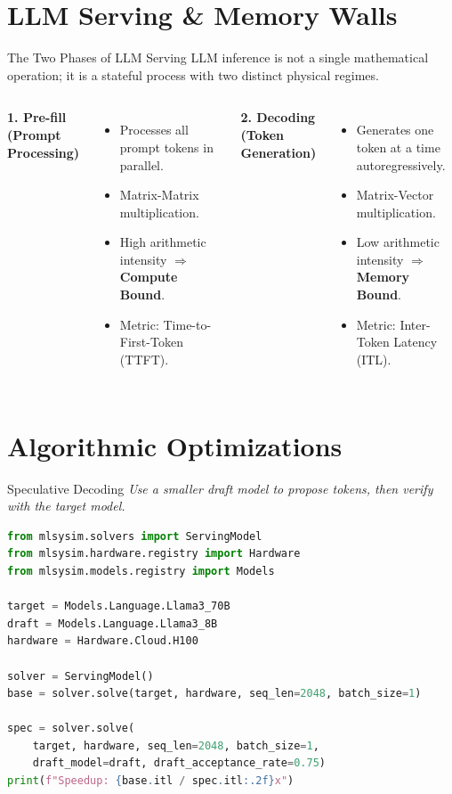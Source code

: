 \documentclass[aspectratio=169, 12pt]{beamer}
\begin{document}
\section{LLM Serving \& Memory Walls}

\begin{frame}{The Two Phases of LLM Serving}
LLM inference is not a single mathematical operation; it is a stateful process with two distinct physical regimes.
\vfill
\begin{columns}[T]
\textbf{1. Pre-fill (Prompt Processing)}
\begin{itemize}
  \item Processes all prompt tokens in parallel.
  \item Matrix-Matrix multiplication.
  \item High arithmetic intensity $\Rightarrow$ \textbf{Compute Bound}.
  \item Metric: Time-to-First-Token (TTFT).
\end{itemize}

\textbf{2. Decoding (Token Generation)}
\begin{itemize}
  \item Generates one token at a time autoregressively.
  \item Matrix-Vector multiplication.
  \item Low arithmetic intensity $\Rightarrow$ \textbf{Memory Bound}.
  \item Metric: Inter-Token Latency (ITL).
\end{itemize}
\end{columns}
\end{frame}

\section{Algorithmic Optimizations}

\begin{frame}[fragile]{Speculative Decoding}
\small
\emph{Use a smaller draft model to propose tokens, then verify with the target model.}
\begin{lstlisting}[language=Python,basicstyle=\ttfamily\tiny]
from mlsysim.solvers import ServingModel
from mlsysim.hardware.registry import Hardware
from mlsysim.models.registry import Models

target = Models.Language.Llama3_70B
draft = Models.Language.Llama3_8B
hardware = Hardware.Cloud.H100

solver = ServingModel()
base = solver.solve(target, hardware, seq_len=2048, batch_size=1)

spec = solver.solve(
    target, hardware, seq_len=2048, batch_size=1,
    draft_model=draft, draft_acceptance_rate=0.75)
print(f"Speedup: {base.itl / spec.itl:.2f}x")
\end{lstlisting}
\end{frame}
\end{document}
